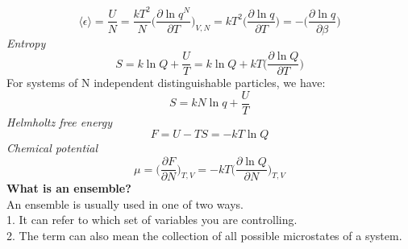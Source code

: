 \documentclass[8pt]{article}
\numberwithin{equation}{section}
\begin{document}
\begin{multicols}{2}
\begin{equation}
\langle \epsilon \rangle = \frac{U}{N}=\frac{kT^{2}}{N}\bigg(\frac{\partial \ln{q^{N}}}{\partial T}\bigg)_{V,N}=kT^{2}\bigg(\frac{\partial\ln{q}}{\partial T}\bigg)=-\bigg(\frac{\partial\ln{q}}{\partial \beta}\bigg) \tag{10.36}
\end{equation}
\textit{Entropy}
\begin{equation}
S=k\ln{Q}+\frac{U}{T}=k\ln{Q}+kT\bigg(\frac{\partial\ln{Q}}{\partial T}\bigg) \tag{10.38}
\end{equation}
For systems of N independent distinguishable particles, we have: 
\begin{equation}
S=kN\ln{q}+\frac{U}{T} \tag{10.39}
\end{equation}
\textit{Helmholtz free energy}
\begin{equation}
F=U-TS=-kT\ln{Q} \tag{10.42}
\end{equation}
\textit{Chemical potential}
\begin{equation}
\mu=\bigg(\frac{\partial F}{\partial N}\bigg)_{T,V}=-kT\bigg(\frac{\partial\ln{Q}}{\partial N}\bigg)_{T,V} \tag{10.43}
\end{equation}
\textbf{What is an ensemble?} \\
An ensemble is usually used in one of two ways.\\ 
1. It can refer to which set of variables you are controlling.  \\
2. The term can also mean the collection of all possible microstates of a system. 

\end{multicols}
\end{document}
